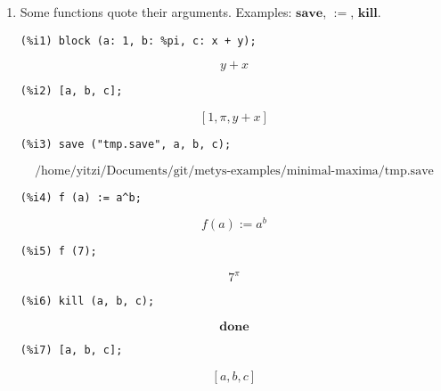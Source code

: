 \documentclass[12pt,leqno]{article}
\begin{document}
\begin{enumerate}
\item Some functions quote their arguments.
Examples: $\mathbf{save}$, $\mathbf{:=}$, $\mathbf{kill}$.
\begin{verbatim}
(%i1) block (a: 1, b: %pi, c: x + y);
\end{verbatim}
\begin{equation}
y+x\tag{\%o1}
\label{eq:doc-group1-code15-1-1}
\end{equation}
\begin{verbatim}
(%i2) [a, b, c];
\end{verbatim}
\begin{equation}
\left[ 1 , \pi , y+x \right] \tag{\%o2}
\label{eq:doc-group1-code15-2-1}
\end{equation}
\begin{verbatim}
(%i3) save ("tmp.save", a, b, c);
\end{verbatim}
\begin{equation}
\mbox{ /home/yitzi/Documents/git/metys-examples/minimal-maxima/tmp.save }\tag{\%o3}
\label{eq:doc-group1-code15-3-1}
\end{equation}
\begin{verbatim}
(%i4) f (a) := a^b;
\end{verbatim}
\begin{equation}
f\left(a\right):=a^{b}\tag{\%o4}
\label{eq:doc-group1-code15-4-1}
\end{equation}
\begin{verbatim}
(%i5) f (7);
\end{verbatim}
\begin{equation}
7^{\pi}\tag{\%o5}
\label{eq:doc-group1-code15-5-1}
\end{equation}
\begin{verbatim}
(%i6) kill (a, b, c);
\end{verbatim}
\begin{equation}
\mathbf{done}\tag{\%o6}
\label{eq:doc-group1-code15-6-1}
\end{equation}
\begin{verbatim}
(%i7) [a, b, c];
\end{verbatim}
\begin{equation}
\left[ a , b , c \right] \tag{\%o7}
\label{eq:doc-group1-code15-7-1}
\end{equation}



\end{enumerate}
\end{document}
